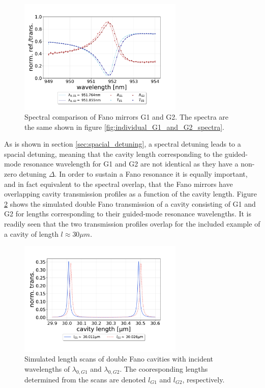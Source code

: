 \begin{figure}[h!]
    \centering
    \includegraphics[width=0.7\textwidth]{figures/results/M3:M5/M3:M5_initial_spectra.pdf}
    \caption{Spectral comparison of Fano mirrors G1 and G2. The spectra are the same shown in figure \ref{fig:individual_G1_and_G2_spectra}.}
    \label{fig:G1_and_G2_spectral_comparison}
\end{figure}

As is shown in section \ref{sec:spacial_detuning}, a spectral detuning leads to a spacial detuning, meaning that the cavity length corresponding to the guided-mode resonance wavelength for G1 and G2 are not identical as they have a non-zero detuning $\Delta$. In order to sustain a Fano resonance it is equally important, and in fact equivalent to the spectral overlap, that the Fano mirrors have overlapping cavity transmission profiles as a function of the cavity length. Figure \ref{fig:G1/G2_length_scan} shows the simulated double Fano transmission of a cavity consisting of G1 and G2 for lengths corresponding to their guided-mode resonance wavelengths. It is readily seen that the two transmission profiles overlap for the included example of a cavity of length $l \approx 30 \mu m$.

\begin{figure}[h!]
    \centering
    \includegraphics[width=0.7\textwidth]{figures/results/M3:M5_length_scan_sim_30um.pdf}
    \caption{Simulated length scans of double Fano cavities with incident wavelengths of $\lambda_{0,G1}$ and $\lambda_{0,G2}$. The cooresponding lengths determined from the scans are denoted $l_{G1}$ and $l_{G2}$, respectively.}
    \label{fig:G1/G2_length_scan}
\end{figure}

